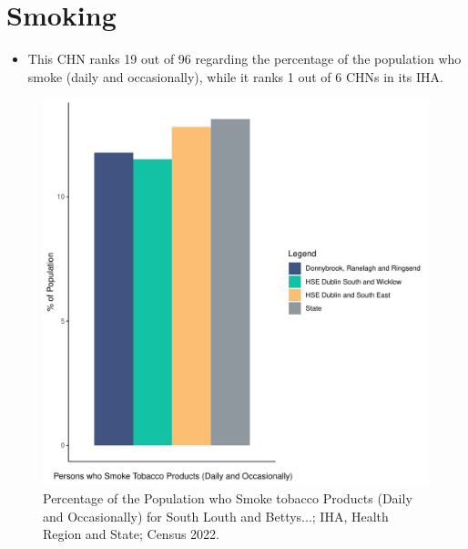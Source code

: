 \documentclass{article}
\begin{document}
\pagebreak

\section{Smoking}\label{sect:Smoking}
\begin{itemize}
\item This CHN ranks  19 out of 96 regarding the percentage of the population who smoke (daily and occasionally), while it ranks   1 out of 6 CHNs in its IHA.
\end{itemize}
\begin{figure}[H]
	\centering
	\includegraphics[width = 120mm]{../figures/SmokingED.pdf}
	\caption{Percentage of the Population who Smoke tobacco Products (Daily and Occasionally) for South Louth and Bettys...; IHA, Health Region and State; Census 2022.}
	\label{fig:2ae19629-1a6a-13a3-e055-000000000001}
	\end{figure}
	
\end{document}
